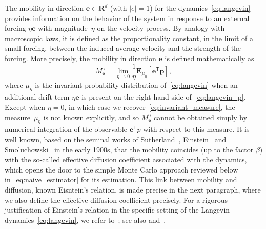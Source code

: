 \documentclass[11pt,a4paper]{article}
\newcommand{\expect}[0]{\mathbf{E}}
\newcommand{\real}{\mathbf R}
\newcommand{\vect}[1]{\boldsymbol{\mathbf #1}}
\newcommand{\mat}[1]{\vect #1}
\renewcommand{\t}{\mathsf T}
\theoremstyle{plain}
\numberwithin{equation}{section}
\begin{document}
The mobility in direction $\vect e \in \real^d$ (with $|e| = 1$)
for the dynamics~\eqref{eq:langevin} provides information on the behavior of the system
in response to an external forcing $\eta \vect e$ with magnitude~$\eta$ on the velocity process.
By analogy with macroscopic laws,
it is defined as the proportionality constant,
in the limit of a small forcing,
between the induced average velocity and the strength  of the forcing.
More precisely,
the mobility in direction $\vect e$ is defined mathematically as
\begin{equation}
    \label{eq:relation_mobility_diffusion}
    M^{\gamma}_{\vect e} =  \lim_{\eta \to 0} \frac{1}{\eta}\expect_{\mu_{\eta}} [\vect e^\t \vect p] ,
\end{equation}
where $\mu_{\eta}$ is the invariant probability distribution of~\eqref{eq:langevin} when
an additional drift term $\eta \vect e$ is present on the right-hand side of~\eqref{eq:langevin_p}.
Except when $\eta = 0$, in which case we recover~\eqref{eq:invariant_measure},
the measure~$\mu_{\eta}$ is not known explicitly,
and so $M_{\vect e}^{\gamma}$ cannot be obtained simply by numerical integration of the observable $\vect e^\t p$ with respect to this measure.
It is well known,
based on the seminal works of Sutherland~\cite{sutherland1905lxxv}, Einstein~\cite{einstein1905molekularkinetischen} and Smoluchowski~\cite{von1906kinetischen} in the early 1900s,
that the mobility coincides
(up to the factor $\beta$)
with the so-called effective diffusion coefficient associated with the dynamics,
which opens the door to the simple Monte Carlo approach reviewed below in~\eqref{eq:naive_estimator} for its estimation.
This link between mobility and diffusion,
known Eisntein's relation,
is made precise in the next paragraph,
where we also define the effective diffusion coefficient precisely.
For a rigorous justification of Einstein's relation in the specific setting of the Langevin dynamics~\eqref{eq:langevin},
we refer to~\cite[Section~5.2]{MR3509213}; see also \cite[Section~3]{LMS16} and~\cite[Chapter~9]{pavliotis2011applied}.

\end{document}

